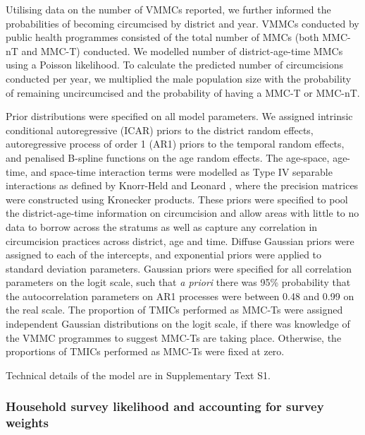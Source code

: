 \documentclass{article}
\begin{document}
Utilising data on the number of VMMCs reported, we further informed the probabilities of becoming circumcised by district and year. VMMCs conducted by public health programmes consisted of the total number of MMCs (both MMC-nT and MMC-T) conducted. We modelled number of district-age-time MMCs using a Poisson likelihood. To calculate the predicted number of circumcisions conducted per year, we multiplied the male population size with the probability of remaining uncircumcised and the probability of having a MMC-T or MMC-nT. 

Prior distributions were specified on all model parameters. We assigned intrinsic conditional autoregressive (ICAR) priors \cite{besag1995conditional} to the district random effects, autoregressive process of order 1 (AR1) priors to the temporal random effects, and penalised B-spline functions on the age random effects. The age-space, age-time, and space-time interaction terms were modelled as Type IV separable interactions as defined by Knorr-Held and Leonard \cite{knorr2000bayesian}, where the precision matrices were constructed using Kronecker products. These priors were specified to pool the district-age-time information on circumcision and allow areas with little to no data to borrow across the stratums as well as capture any correlation in circumcision practices across district, age and time. Diffuse Gaussian priors were assigned to each of the intercepts, and exponential priors were applied to standard deviation parameters. Gaussian priors were specified for all correlation parameters on the logit scale, such that \textit{a priori} there was 95\% probability that the autocorrelation parameters on AR1 processes were between 0.48 and 0.99 on the real scale. The proportion of TMICs performed as MMC-Ts were assigned independent Gaussian distributions on the logit scale, if there was knowledge of the VMMC programmes to suggest MMC-Ts are taking place. Otherwise, the proportions of TMICs performed as MMC-Ts were fixed at zero. 

Technical details of the model are in Supplementary Text S1.


\subsubsection*{Household survey likelihood and accounting for survey weights}

\end{document}
